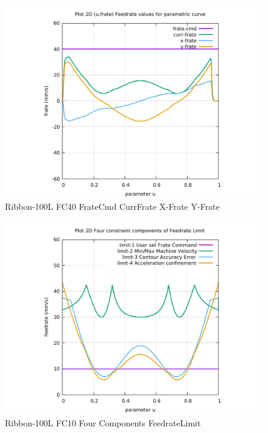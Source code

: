 \begin{figure}
	\caption     {Ribbon-100L FC40 FrateCmd CurrFrate X-Frate Y-Frate}
	\label{30-img-Ribbon-100L-FC40-FrateCmd-CurrFrate-X-Frate-Y-Frate.pdf}
\includegraphics[width=1.00\textwidth]{Chap4/appendix/app-Ribbon-100L/plots/30-img-Ribbon-100L-FC40-FrateCmd-CurrFrate-X-Frate-Y-Frate.pdf}
\end{figure}


\clearpage
\pagebreak

\begin{figure}
	\caption     {Ribbon-100L FC10 Four Components FeedrateLimit}
	\label{31-img-Ribbon-100L-FC10-Four-Components-FeedrateLimit.pdf}
\includegraphics[width=1.00\textwidth]{Chap4/appendix/app-Ribbon-100L/plots/31-img-Ribbon-100L-FC10-Four-Components-FeedrateLimit.pdf}
\end{figure}


